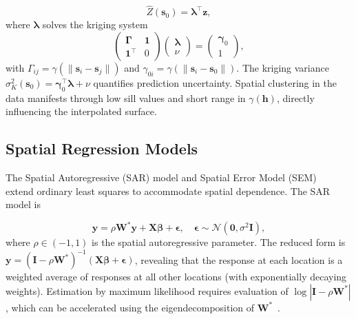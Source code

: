 \documentclass[conference]{IEEEtran}
\theoremstyle{definition}
\begin{document}
\begin{equation}
\hat{Z}(\mathbf{s}_0) = \boldsymbol{\lambda}^\top \mathbf{z},
\end{equation}
where $\boldsymbol{\lambda}$ solves the kriging system
\begin{equation}
\begin{pmatrix} \boldsymbol{\Gamma} & \mathbf{1} \\ \mathbf{1}^\top & 0 \end{pmatrix}
\begin{pmatrix} \boldsymbol{\lambda} \\ \nu \end{pmatrix}
=
\begin{pmatrix} \boldsymbol{\gamma}_0 \\ 1 \end{pmatrix},
\label{eq:kriging_system}
\end{equation}
with $\Gamma_{ij} = \gamma(\|\mathbf{s}_i - \mathbf{s}_j\|)$ and $\gamma_{0i} = \gamma(\|\mathbf{s}_i - \mathbf{s}_0\|)$. The kriging variance $\sigma_K^2(\mathbf{s}_0) = \boldsymbol{\gamma}_0^\top\boldsymbol{\lambda} + \nu$ quantifies prediction uncertainty. Spatial clustering in the data manifests through low sill values and short range in $\gamma(\mathbf{h})$, directly influencing the interpolated surface.

\subsection{Spatial Regression Models}

The Spatial Autoregressive (SAR) model and Spatial Error Model (SEM)~\cite{anselin1988} extend ordinary least squares to accommodate spatial dependence. The SAR model is

\begin{equation}
\mathbf{y} = \rho \mathbf{W}^* \mathbf{y} + \mathbf{X}\boldsymbol{\beta} + \boldsymbol{\epsilon}, \quad \boldsymbol{\epsilon} \sim \mathcal{N}(\mathbf{0}, \sigma^2 \mathbf{I}),
\label{eq:SAR}
\end{equation}
where $\rho \in (-1,1)$ is the spatial autoregressive parameter. The reduced form is $\mathbf{y} = (\mathbf{I} - \rho\mathbf{W}^*)^{-1}(\mathbf{X}\boldsymbol{\beta} + \boldsymbol{\epsilon})$, revealing that the response at each location is a weighted average of responses at all other locations (with exponentially decaying weights). Estimation by maximum likelihood requires evaluation of $\log|\mathbf{I} - \rho\mathbf{W}^*|$, which can be accelerated using the eigendecomposition of $\mathbf{W}^*$~\cite{ord1975}.
\end{document}
